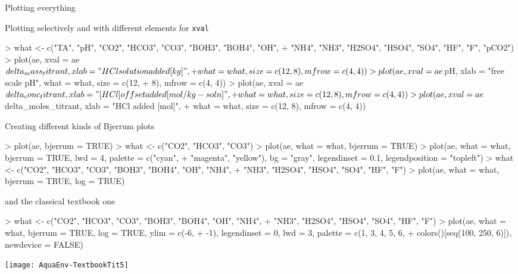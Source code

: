 \documentclass[article,nojss]{jss}
\begin{document}
Plotting everything
\begin{Schunk}
\end{Schunk}

Plotting selectively and with different elements for \texttt{xval}
\begin{Schunk}
\begin{Sinput}
> what <- c("TA", "pH", "CO2", "HCO3", "CO3", "BOH3", "BOH4", "OH", 
+     "NH4", "NH3", "H2SO4", "HSO4", "SO4", "HF", "F", "pCO2")
> plot(ae, xval = ae$delta_mass_titrant, xlab = "HCl solution added [kg]", 
+     what = what, size = c(12, 8), mfrow = c(4, 4))
> plot(ae, xval = ae$pH, xlab = "free scale pH", what = what, size = c(12, 
+     8), mfrow = c(4, 4))
> plot(ae, xval = ae$delta_conc_titrant, xlab = "[HCl] offset added [mol/kg-soln]", 
+     what = what, size = c(12, 8), mfrow = c(4, 4))
> plot(ae, xval = ae$delta_moles_titrant, xlab = "HCl added [mol]", 
+     what = what, size = c(12, 8), mfrow = c(4, 4))
\end{Sinput}
\end{Schunk}



Creating different kinds of Bjerrum plots
\begin{Schunk}
\begin{Sinput}
> plot(ae, bjerrum = TRUE)
> what <- c("CO2", "HCO3", "CO3")
> plot(ae, what = what, bjerrum = TRUE)
> plot(ae, what = what, bjerrum = TRUE, lwd = 4, palette = c("cyan", 
+     "magenta", "yellow"), bg = "gray", legendinset = 0.1, legendposition = "topleft")
> what <- c("CO2", "HCO3", "CO3", "BOH3", "BOH4", "OH", "NH4", 
+     "NH3", "H2SO4", "HSO4", "SO4", "HF", "F")
> plot(ae, what = what, bjerrum = TRUE, log = TRUE)
\end{Sinput}
\end{Schunk}

and the classical textbook one
\begin{Schunk}
\begin{Sinput}
> what <- c("CO2", "HCO3", "CO3", "BOH3", "BOH4", "OH", "NH4", 
+     "NH3", "H2SO4", "HSO4", "SO4", "HF", "F")
> plot(ae, what = what, bjerrum = TRUE, log = TRUE, ylim = c(-6, 
+     -1), legendinset = 0, lwd = 3, palette = c(1, 3, 4, 5, 6, 
+     colors()[seq(100, 250, 6)]), newdevice = FALSE)
\end{Sinput}
\end{Schunk}
\texttt{[image: AquaEnv-TextbookTit5]}
\end{document}
